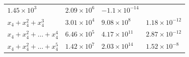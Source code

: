 \documentclass[
]{article}
\begin{document}
\begin{longtable}[]{@{}llll@{}}
\begin{minipage}[t]{0.15\columnwidth}
\(1.45 \times 10^{3}\)\strut
\end{minipage} & \begin{minipage}[t]{0.15\columnwidth}\raggedright
\(2.09 \times 10^{6}\)\strut
\end{minipage} & \begin{minipage}[t]{0.36\columnwidth}\raggedright
\(-1.1 \times 10^{-14}\)\strut
\end{minipage}\tabularnewline
\begin{minipage}[t]{0.23\columnwidth}\raggedright
\(x_{4}+x_{4}^{2}+x_{4}^{3}\)\strut
\end{minipage} & \begin{minipage}[t]{0.15\columnwidth}\raggedright
\(3.01 \times 10^{4}\)\strut
\end{minipage} & \begin{minipage}[t]{0.15\columnwidth}\raggedright
\(9.08 \times 10^{8}\)\strut
\end{minipage} & \begin{minipage}[t]{0.36\columnwidth}\raggedright
\(1.18 \times 10^{-12}\)\strut
\end{minipage}\tabularnewline
\begin{minipage}[t]{0.23\columnwidth}\raggedright
\(x_{4}+x_{4}^{2}+\dots+x_{4}^{4}\)\strut
\end{minipage} & \begin{minipage}[t]{0.15\columnwidth}\raggedright
\(6.46 \times 10^{5}\)\strut
\end{minipage} & \begin{minipage}[t]{0.15\columnwidth}\raggedright
\(4.17 \times 10^{11}\)\strut
\end{minipage} & \begin{minipage}[t]{0.36\columnwidth}\raggedright
\(2.87 \times 10^{-12}\)\strut
\end{minipage}\tabularnewline
\begin{minipage}[t]{0.23\columnwidth}\raggedright
\(x_{4}+x_{4}^{2}+\dots+x_{4}^{5}\)\strut
\end{minipage} & \begin{minipage}[t]{0.15\columnwidth}\raggedright
\(1.42 \times 10^{7}\)\strut
\end{minipage} & \begin{minipage}[t]{0.15\columnwidth}\raggedright
\(2.03 \times 10^{14}\)\strut
\end{minipage} & \begin{minipage}[t]{0.36\columnwidth}\raggedright
\(1.52 \times 10^{-8}\)\strut
\end{minipage}\tabularnewline

\end{longtable}
\end{document}
